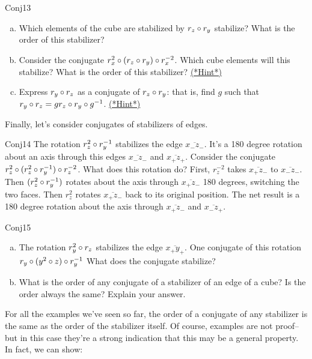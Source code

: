 \begin{exercise}{Conj13}
\begin{enumerate}[(a)]
\item Which elements of the cube are stabilized by $r_z\circ r_y$ stabilize?  What is the order of this stabilizer?  
\item Consider the conjugate $r_x^{2}\circ (r_z\circ r_y)\circ r_x^{-2}$.  Which cube elements will this stabilize?  What is the order of this stabilizer?
\hyperref[sec:GroupActions:Hints]{(*Hint*)}
\item Express  $r_y\circ r_z$ as a conjugate of $r_z\circ r_y$: that is, find $g$ such that 
$r_y\circ r_z = g r_z\circ r_y \circ g^{-1}$. 
\hyperref[sec:GroupActions:Hints]{(*Hint*)}
\end {enumerate}	
\end {exercise}

Finally, let's consider  conjugates of stabilizers of edges.

\begin{example}{Conj14}
The rotation $r_z^2\circ r_y^{-1}$ stabilizes the edge $\overline{x_- z_-}$.  It's a 180 degree rotation about an axis through this edges  $\overline{x_- z_-}$ and $\overline{x_+z_+}$. Consider the conjugate   $r_z^{2}\circ (r_z^2\circ r_y^{-1})\circ r_z^{-2}$.  What does this rotation do?  First,  $r_z^{-2}$ takes $\overline{x_+z_-}$ to $\overline{x_-z_-}$.  Then $(r_z^2\circ r_y^{-1})$ rotates about the axis through $\overline{x_+z_-}$ 180 degrees, switching the two faces. Then $r_z^2$ rotates $\overline{x_+z_-}$ back to its original position.  The net result is a 180 degree rotation about the axis through $\overline{x_+z_-}$ and $\overline{x_-z_+}$.
\end{example}

\begin{exercise}{Conj15}
\begin{enumerate}[(a)]
\item The rotation $r_y^2\circ r_z$ stabilizes the edge $\overline{x_+y_+}$. One conjugate of this rotation $r_y\circ (y^2\circ z)\circ r_y^{-1}$ What does the conjugate stabilize?
\item What is the order of any conjugate of a stabilizer of an edge of a cube? Is the  order always the same?  Explain your answer.
\end {enumerate}
\end{exercise}

For all the examples we've seen so far, the order of a conjugate of any stabilizer is the same as the order of the stabilizer itself. Of course, examples are not proof--but in this case they're a strong indication that this may be a general property. In fact, we can show: 

